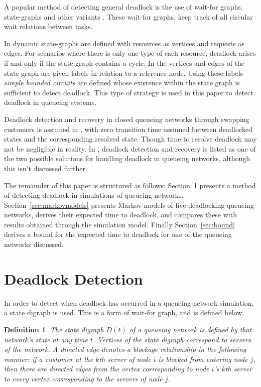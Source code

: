 \documentclass{article}
\newtheorem{definition}{Definition}
\numberwithin{equation}{section}
\begin{document}
A popular method of detecting general deadlock is the use of wait-for graphs, state-graphs and other variants \cite{cheng90, elmagarmid86, coffmanelphick71, choetal95}.
These wait-for graphs, keep track of all circular wait relations between tasks.

In \cite{coffmanelphick71} dynamic state-graphs are defined with resources as vertices and requests as edges.
For scenarios where there is only one type of each resource, deadlock arises if and only if the state-graph contains a cycle.
In \cite{choetal95} the vertices and edges of the state graph are given labels in relation to a reference node.
Using these labels \textit{simple bounded circuits} are defined whose existence within the state graph is sufficient to detect deadlock.
This type of strategy is used in this paper to detect deadlock in queueing systems.

Deadlock detection and recovery in closed queueing networks through swapping customers is assumed in \cite{perrosetal88}, with zero transition time assumed between deadlocked states and the corresponding resolved state. Though time to resolve deadlock may not be negligible in reality.
In \cite{akyildiz89}, deadlock detection and recovery is listed as one of the two possible solutions for handling deadlock in queueing networks, although this isn't discussed further.


The remainder of this paper is structured as follows: Section~\ref{sec:detectingdeadlock} presents a method of detecting deadlock in simulations of queueing networks. Section~\ref{sec:markovmodels} presents Markov models of five deadlocking queueing networks, derives their expected time to deadlock, and compares these with results obtained through the simulation model. Finally Section~\ref{sec:bound} derives a bound for the expected time to deadlock for one of the queueing networks discussed.


\section{Deadlock Detection}\label{sec:detectingdeadlock}

In order to detect when deadlock has occurred in a queueing network simulation, a state digraph is used.
This is a form of wait-for graph, and is defined below.

\begin{definition}
The state digraph $D(t)$ of a queueing network is defined by that network's state at any time $t$.
Vertices of the state digraph correspond to servers of the network.
A directed edge denotes a blockage relationship in the following manner: if a customer at the $k$th server of node $i$ is blocked from entering node $j$, then there are directed edges from the vertex corresponding to node $i$'s $k$th server to every vertex corresponding to the servers of node $j$.
\end{definition}
\end{document}
